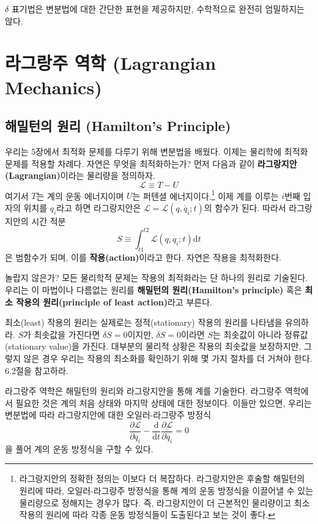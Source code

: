\documentclass[chapter, oneside, b5paper]{oblivoir}
\theoremstyle{plain}
\theoremstyle{definition}
\theoremstyle{remark}
\begin{document}
$\delta$ 표기법은 변분법에 대한 간단한 표현을 제공하지만, 수학적으로 완전히 엄밀하지는 않다.

\newpage
\chapter{라그랑주 역학 (Lagrangian Mechanics)}

\section{해밀턴의 원리 (Hamilton's Principle)}
우리는 5장에서 최적화 문제를 다루기 위해 변분법을 배웠다. 이제는 물리학에 최적화 문제를 적용할 차례다. 자연은 무엇을 최적화하는가? 먼저 다음과 같이 \textbf{라그랑지안(Lagrangian)}이라는 물리량을 정의하자.
\begin{equation}
    \mathcal{L} \equiv T - U
\end{equation}
여기서 $T$는 계의 운동 에너지이며 $U$는 퍼텐셜 에너지이다.\footnote{라그랑지안의 정확한 정의는 이보다 더 복잡하다. 라그랑지안은 후술할 해밀턴의 원리에 따라, 오일러-라그랑주 방정식을 통해 계의 운동 방정식을 이끌어낼 수 있는 물리량으로 정해지는 경우가 많다. 즉, 라그랑지안이 더 근본적인 물리량이고 최소 작용의 원리에 따라 각종 운동 방정식들이 도출된다고 보는 것이 좋다.} 이제 계를 이루는 $i$번째 입자의 위치를 $q_i$라고 하면 라그랑지안은 $\mathcal{L} = \mathcal{L}(q, \dot{q_i} ; t)$의 함수가 된다. 따라서 라그랑지안의 시간 적분
\begin{equation}
    S \equiv \int_{t1}^{t2} \mathcal{L}(q, \dot{q_i} ; t) \mathrm{d}t
\end{equation}
은 범함수가 되며, 이를 \textbf{작용(action)}이라고 한다. 자연은 작용을 최적화한다.

놀랍지 않은가? 모든 물리학적 문제는 작용의 최적화라는 단 하나의 원리로 기술된다. 우리는 이 마법이나 다름없는 원리를 \textbf{해밀턴의 원리(Hamilton's principle)} 혹은 \textbf{최소 작용의 원리(principle of least action)}라고 부른다.

최소(least) 작용의 원리는 실제로는 정적(stationary) 작용의 원리를 나타냄을 유의하라. $S$가 최솟값을 가진다면 $\delta S = 0$이지만, $\delta S = 0$이라면 $S$는 최솟값이 아니라 정류값(stationary value)을 가진다. 대부분의 물리적 상황은 작용의 최솟값을 보장하지만, 그렇지 않은 경우 우리는 작용의 최소화를 확인하기 위해 몇 가지 절차를 더 거쳐야 한다. 6.2절을 참고하라.

라그랑주 역학은 해밀턴의 원리와 라그랑지안을 통해 계를 기술한다. 라그랑주 역학에서 필요한 것은 계의 처음 상태와 마지막 상태에 대한 정보이다. 이들만 있으면, 우리는 변분법에 따라 라그랑지안에 대한 오일러-라그랑주 방정식
\begin{equation}
    \frac{\partial \mathcal{L}}{\partial q_i} - \frac{\mathrm{d}}{\mathrm{d}t}\frac{\partial \mathcal{L}}{\partial \dot{q_i}} = 0
    \label{eq:6.3}
\end{equation}
을 풀어 계의 운동 방정식을 구할 수 있다.
\end{document}

